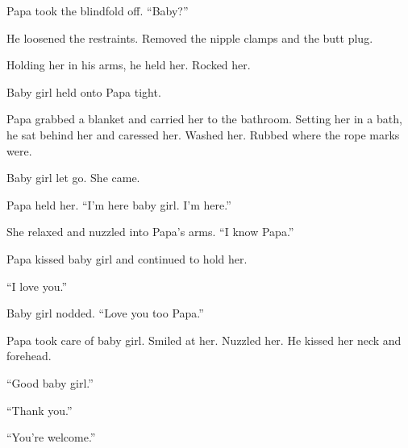     Papa took the blindfold off. “Baby?”

    He loosened the restraints. Removed the nipple clamps and the butt plug.

    Holding her in his arms, he held her. Rocked her.

    Baby girl held onto Papa tight.

    Papa grabbed a blanket and carried her to the bathroom. Setting her in a bath, he sat behind her and caressed her. Washed her. Rubbed where the rope marks were.

    Baby girl let go. She came.

    Papa held her. “I’m here baby girl. I’m here.”

    She relaxed and nuzzled into Papa’s arms. “I know Papa.”

    Papa kissed baby girl and continued to hold her.

    “I love you.”

    Baby girl nodded. “Love you too Papa.”

    Papa took care of baby girl. Smiled at her. Nuzzled her.  He kissed her neck and forehead.

    “Good baby girl.”

    “Thank you.”

    “You’re welcome.”

